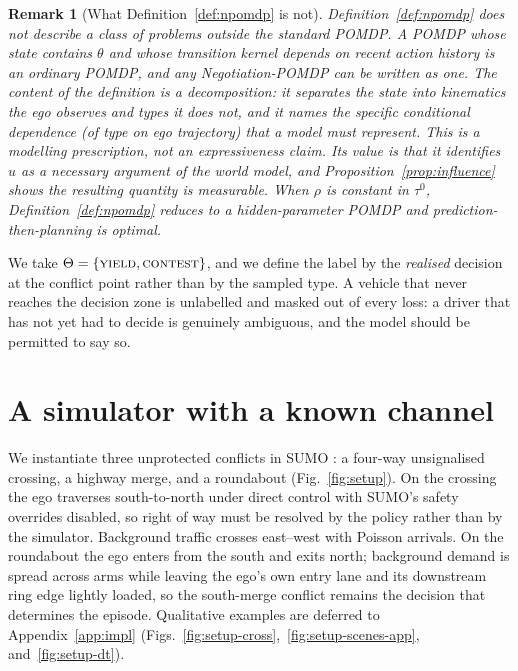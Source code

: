 \documentclass[conference]{IEEEtran}
\newcommand{\yield}{\textsc{yield}}
\newcommand{\contest}{\textsc{contest}}
\newtheorem{remark}{Remark}
\begin{document}
\begin{remark}[What Definition~\ref{def:npomdp} is not]
\label{rem:notnew}
Definition~\ref{def:npomdp} does not describe a class of problems outside the
standard POMDP. A POMDP whose state contains $\theta$ and whose transition kernel
depends on recent action history is an ordinary POMDP, and any
Negotiation-POMDP can be written as one. The content of the definition is a
\emph{decomposition}: it separates the state into kinematics the ego observes
and types it does not, and it names the specific conditional dependence (of type on ego trajectory) that a model must represent. This is a modelling
prescription, not an expressiveness claim. Its value is that it identifies
$u$ as a necessary argument of the world model, and
Proposition~\ref{prop:influence} shows the resulting quantity is measurable.
When $\rho$ is constant in $\tau^0$, Definition~\ref{def:npomdp} reduces to a
hidden-parameter POMDP \cite{doshi2016hidden} and prediction-then-planning is
optimal.
\end{remark}

We take $\Theta = \{\yield, \contest\}$, and we define the label by the
\emph{realised} decision at the conflict point rather than by the sampled type.
A vehicle that never reaches the decision zone is unlabelled and masked out of
every loss: a driver that has not yet had to decide is genuinely ambiguous, and
the model should be permitted to say so.

\section{A simulator with a known channel}
\label{sec:sim}

We instantiate three unprotected conflicts in SUMO \cite{lopez2018sumo}: a
four-way unsignalised crossing, a highway merge, and a roundabout (Fig.~\ref{fig:setup}). On the crossing the ego traverses south-to-north under direct control
with SUMO's safety overrides disabled, so right of way must be resolved by the
policy rather than by the simulator. Background traffic crosses east--west with
Poisson arrivals. On the roundabout the ego enters from the south and exits
north; background demand is spread across arms while leaving the ego's own
entry lane and its downstream ring edge lightly loaded, so the south-merge
conflict remains the decision that determines the episode. Qualitative examples
are deferred to Appendix~\ref{app:impl}
(Figs.~\ref{fig:setup-cross},~\ref{fig:setup-scenes-app}, and~\ref{fig:setup-dt}).
\end{document}

